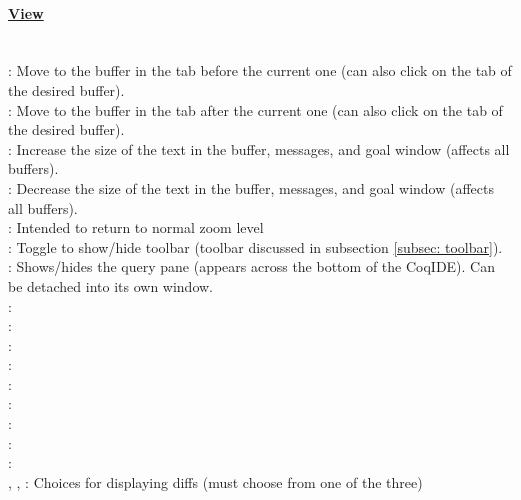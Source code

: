\paragraph{\underline{View}}
~\\
 : Move to the buffer in the tab before the current one (can also click on the tab of the desired buffer). 
\\
 : Move to the buffer in the tab after the current one (can also click on the tab of the desired buffer).
\\
 : Increase the size of the text in the buffer, messages, and goal window (affects all buffers).  
\\
 : Decrease the size of the text in the buffer, messages, and goal window (affects all buffers).  
\\
 : Intended to return to normal zoom level %
\\
 : Toggle to show/hide toolbar (toolbar discussed in subsection \ref{subsec: toolbar}). 
\\
 : Shows/hides the query pane (appears across the bottom of the CoqIDE). 
	Can be detached into its own window. 
\\
 : 
\\
 : 
\\
 : 
\\
 : 
\\
 : 
\\
 : 
\\
 : 
\\
 : 
\\
 : 
\\
, ,  : Choices for displaying diffs (must choose from one of the three)

	
	
	
~\\
